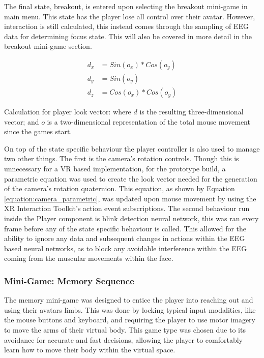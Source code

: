 \documentclass[11pt, a4paper]{article}
\newcommand{\refequation}[1]{Equation \ref{#1}}
\begin{document}
The final state, breakout, is entered upon selecting the breakout mini-game in main menu. This state has the player lose all control over their avatar. However, interaction is still calculated, this instead comes through the sampling of EEG data for determining focus state. This will also be covered in more detail in the breakout mini-game section.

\begin{equ}[H]
	\large
	\centering
	\begin{align}
		d_x & = Sin(o_x) *  Cos(o_y) 	\nonumber 	\\
		d_y & = Sin(o_y) 				\nonumber	\\
		d_z & = Cos(o_x) *  Cos(o_y)
		\label{equation:camera_parametric}
	\end{align}
	\captionsetup{font = small, labelfont = small, labelformat = empty, width = .8\linewidth}
	\caption{Calculation for player look vector: where \(d\) is the resulting three-dimensional vector; and \(o\) is a two-dimensional representation of the total mouse movement since the games start.}
\end{equ}

\pagebreak

On top of the state specific behaviour the player controller is also used to manage two other things. The first is the camera's rotation controls. Though this is unnecessary for a VR based implementation, for the prototype build, a parametric equation was used to create the look vector needed for the generation of the camera's rotation quaternion. This equation, as shown by \refequation{equation:camera_parametric}, was updated upon mouse movement by using the XR Interaction Toolkit's action event subscriptions. The second behaviour run inside the Player component is blink detection neural network, this was ran every frame before any of the state specific behaviour is called. This allowed for the ability to ignore any data and subsequent changes in actions within the EEG based neural networks, as to block any avoidable interference within the EEG coming from the muscular movements within the face.


\subsubsection{Mini-Game: Memory Sequence}

The memory mini-game was designed to entice the player into reaching out and using their avatars limbs. This was done by locking typical input modalities, like the mouse buttons and keyboard, and requiring the player to use motor imagery to move the arms of their virtual body. This game type was chosen due to its avoidance for accurate and fast decisions, allowing the player to comfortably learn how to move their body within the virtual space.
\end{document}
